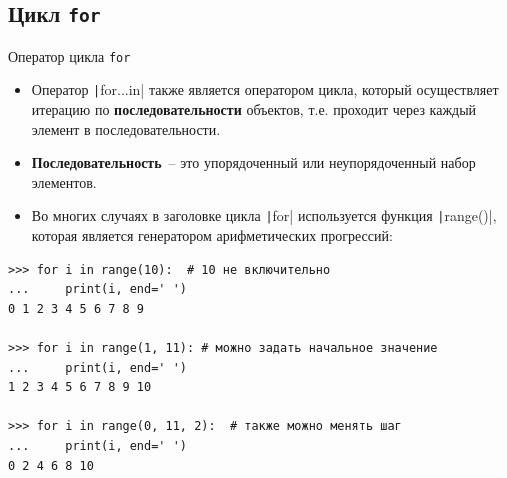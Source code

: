\documentclass[aspectratio=169, mathserif]{beamer}	%
\begin{document}
\subsection{Цикл \texttt{for}}
\scriptsize
\begin{frame}[fragile]{Оператор цикла \texttt{for}}
	\begin{itemize}
		\item Оператор \texttt|for...in| также является оператором цикла, который осуществляет итерацию по \textcolor{extraorange}{\textbf{последовательности}} объектов, т.е. проходит через каждый элемент в последовательности.
		
		\item \textcolor{extraorange}{\textbf{Последовательность}}~-- это упорядоченный или неупорядоченный набор элементов.
		
		\item Во многих случаях в заголовке цикла \texttt|for| используется функция \texttt|range()|, которая является генератором арифметических прогрессий:
	\end{itemize}

\begin{verbatim}
>>> for i in range(10):  # 10 не включительно
...     print(i, end=' ')
0 1 2 3 4 5 6 7 8 9

>>> for i in range(1, 11): # можно задать начальное значение
...     print(i, end=' ')
1 2 3 4 5 6 7 8 9 10

>>> for i in range(0, 11, 2):  # также можно менять шаг
...     print(i, end=' ')
0 2 4 6 8 10
\end{verbatim}
\vfill
\end{frame}


%
%


%
\end{document}
